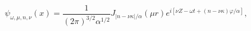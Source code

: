 \begin{equation}
\psi_{\omega,\mu,n,\nu}(x)=
\frac{1}{(2\pi)^{3/2}\alpha ^{1/2}}
J_{|n-\nu\kappa|/\alpha}(\mu r)
e^{i[\nu Z- \omega t+(n-\nu\kappa)\varphi/\alpha]},
\label{eig1}
\end{equation}

